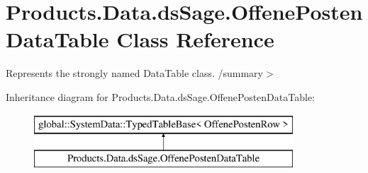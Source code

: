 \hypertarget{class_products_1_1_data_1_1ds_sage_1_1_offene_posten_data_table}{}\section{Products.\+Data.\+ds\+Sage.\+Offene\+Posten\+Data\+Table Class Reference}
\label{class_products_1_1_data_1_1ds_sage_1_1_offene_posten_data_table}


Represents the strongly named Data\+Table class. /summary$>$  


Inheritance diagram for Products.\+Data.\+ds\+Sage.\+Offene\+Posten\+Data\+Table\+:\begin{figure}[H]
\begin{center}
\leavevmode
\includegraphics[height=2.000000cm]{class_products_1_1_data_1_1ds_sage_1_1_offene_posten_data_table}
\end{center}
\end{figure}
